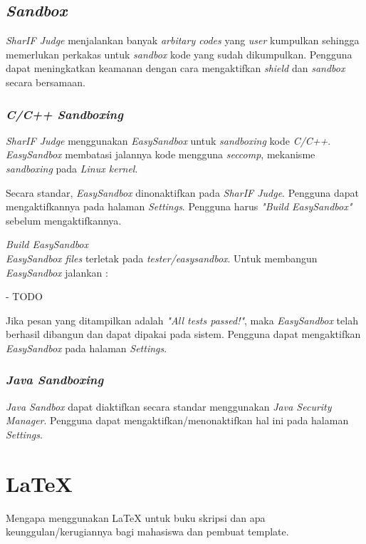 \subsection{\textit{Sandbox}}
\textit{SharIF Judge} menjalankan banyak \textit{arbitary codes} yang \textit{user} kumpulkan sehingga memerlukan perkakas untuk \textit{sandbox} kode yang sudah dikumpulkan. Pengguna dapat meningkatkan keamanan dengan cara mengaktifkan \textit{shield} dan \textit{sandbox} secara bersamaan.

\subsubsection{\textit{C/C++ Sandboxing}}
\textit{SharIF Judge} menggunakan \textit{EasySandbox} untuk \textit{sandboxing} kode \textit{C/C++}. \textit{EasySandbox} membatasi jalannya kode mengguna \textit{seccomp}, mekanisme \textit{sandboxing} pada \textit{Linux kernel}.

Secara standar, \textit{EasySandbox} dinonaktifkan pada \textit{SharIF Judge}. Pengguna dapat mengaktifkannya pada halaman \textit{Settings}. Pengguna harus \textit{"Build EasySandbox"} sebelum mengaktifkannya.

\textit{Build EasySandbox} \\
\textit{EasySandbox files} terletak pada \textit{tester/easysandbox}. Untuk membangun \textit{EasySandbox} jalankan :

- TODO

Jika pesan yang ditampilkan adalah \textit{"All tests passed!"}, maka \textit{EasySandbox} telah berhasil dibangun dan dapat dipakai pada sistem. Pengguna dapat mengaktifkan \textit{EasySandbox} pada halaman \textit{Settings}.

\subsubsection{\textit{Java Sandboxing}}
\textit{Java Sandbox} dapat diaktifkan secara standar menggunakan \textit{Java Security Manager}. Pengguna dapat mengaktifkan/menonaktifkan hal ini pada halaman \textit{Settings}.

\section{\LaTeX}
\label{sec:latex}

Mengapa menggunakan \LaTeX{} untuk buku skripsi dan apa keunggulan/kerugiannya bagi mahasiswa dan pembuat template. 

